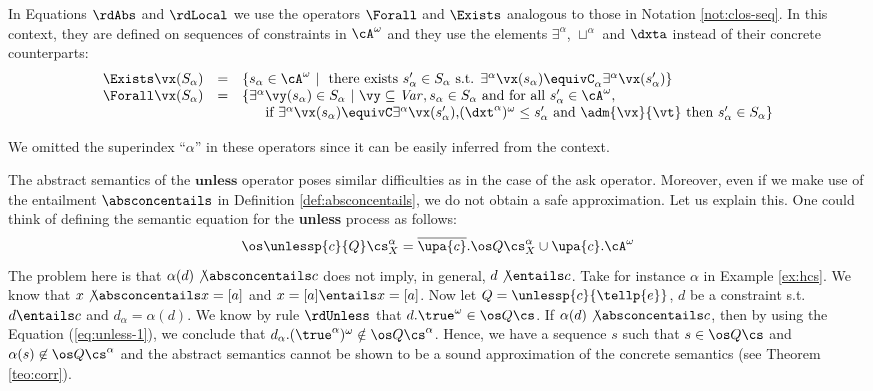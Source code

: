 \documentclass{tlp}
\begin{document}
In Equations  $\rdAbs$ and $\rdLocal$ we use the operators $\Forall$ and $\Exists$ analogous to those in  Notation \ref{not:clos-seq}.  In this context, they are defined on sequences of constraints in $\cA^\omega$ and they use the elements  $\exists^\alpha$,  $\sqcup^\alpha$ and  $\dxta$ instead of their concrete counterparts:
 \[
 \begin{array}{lll}
 \Exists \vx(S_\alpha) &=& \{s_\alpha\in \cA^\omega \ | \ \mbox{ there exists } s'_\alpha\in S_\alpha \mbox{ s.t. }  \exists^\alpha \vx (s_\alpha) \equivC_\alpha \exists^\alpha \vx (s'_\alpha) \}\\
   \Forall \vx (S_\alpha) &=& \{ \exists^\alpha \vy(s_\alpha) \in S_\alpha \  |  \
  \vy \subseteq {\it Var}, s_\alpha \in S_\alpha 
    \mbox{ and for all  } s'_\alpha \in \cA^\omega, \\
  & & \quad\    \mbox{ if } 
  \exists^\alpha \vx (s_\alpha) \equivC \exists^\alpha \vx (s'_\alpha) \mbox{,} 
 (\dxt^\alpha)^\omega \leq s_\alpha' \mbox{ and } \adm{\vx}{\vt}  \mbox{ then } s'_\alpha \in S_\alpha  \}
 \end{array}
 \]

 We omitted the superindex ``$\alpha$'' in these operators since it can be easily inferred from the context. 

 


 

The abstract semantics of the $\mathbf{unless}$ operator poses similar difficulties as in the case of the ask operator. Moreover, even if we 
make use of the entailment 
$\absconcentails$  in Definition \ref{def:absconcentails}, we do not obtain a safe approximation. Let us explain this. 
One could think of defining  the semantic equation for the {\bf unless} process as follows:
\begin{equation} \label{eq:unless-1}
\os \unlessp{c}{Q} \cs^{\alpha}_{X}=
\overline{\upa{c}}.\os Q\cs^{\alpha}_X \cup \upa{c}.\cA^\omega
\end{equation}
The problem here is that $\alpha(d)  \not \absconcentails c$  does not imply, in general,     $d \not\entails c$. 
Take for instance $\alpha$ in Example \ref{ex:hcs}. We know that  $x \not\absconcentails x=[a]$ and $x=[a] \entails x=[a]$. 
Now let  $Q=\unlessp{c}{\tellp{e}}$, $d$ be a constraint s.t. $d\entails c$
and $d_{\alpha}= \alpha(d)$. 
 We know by rule $\rdUnless$ that  $d.\true^\omega \in \os Q \cs$. If $\alpha(d) \not\absconcentails c$, then 
by using the Equation (\ref{eq:unless-1}), we conclude that 
$  d_{\alpha}.(\true^{\alpha})^\omega \notin \os Q\cs^{\alpha}
$. Hence, we have a sequence $s$ such that  $s \in \os Q\cs$ and $\alpha(s) \not \in \os Q\cs^{\alpha}$ and the abstract semantics cannot be shown to be   a sound approximation of the concrete semantics (see Theorem \ref{teo:corr}). 
\end{document}
